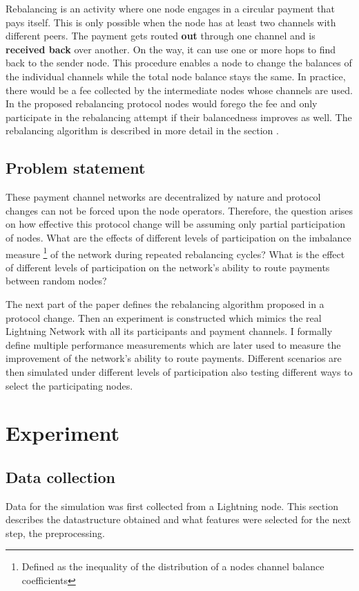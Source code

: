 \documentclass[final]{fhnwreport}       %
\begin{document}
Rebalancing is an activity where one node engages in a circular payment that pays itself. This is only possible when the node has at least two channels with different peers. The payment gets routed \textbf{out} through one channel and is \textbf{received back} over another. On the way, it can use one or more hops to find back to the sender node. This procedure enables a node to change the balances of the individual channels while the total node balance stays the same. In practice, there would be a fee collected by the intermediate nodes whose channels are used. In the proposed rebalancing protocol nodes would forego the fee and only participate in the rebalancing attempt if their balancedness improves as well. The rebalancing algorithm is described in more detail in the section . 


\subsection{Problem statement}
These payment channel networks are decentralized by nature and protocol changes can not be forced upon the node operators. Therefore, the question arises on how effective this protocol change will be assuming only partial participation of nodes. What are the effects of different levels of participation on the imbalance measure \footnote{Defined as the inequality of the distribution of a nodes channel balance coefficients} of the network during repeated rebalancing cycles? What is the effect of different levels of participation on the network's ability to route payments between random nodes? 

The next part of the paper defines the rebalancing algorithm proposed in a protocol change. Then an experiment is constructed which mimics the real Lightning Network with all its participants and payment channels. I formally define multiple performance measurements which are later used to measure the improvement of the network's ability to route payments. Different scenarios are then simulated under different levels of participation also testing different ways to select the participating nodes.

\newpage
\section{Experiment}\label{sec:method}
\subsection{Data collection}
Data for the simulation was first collected from a Lightning node. This section describes the datastructure obtained and what features were selected for the next step, the preprocessing. 
\end{document}
